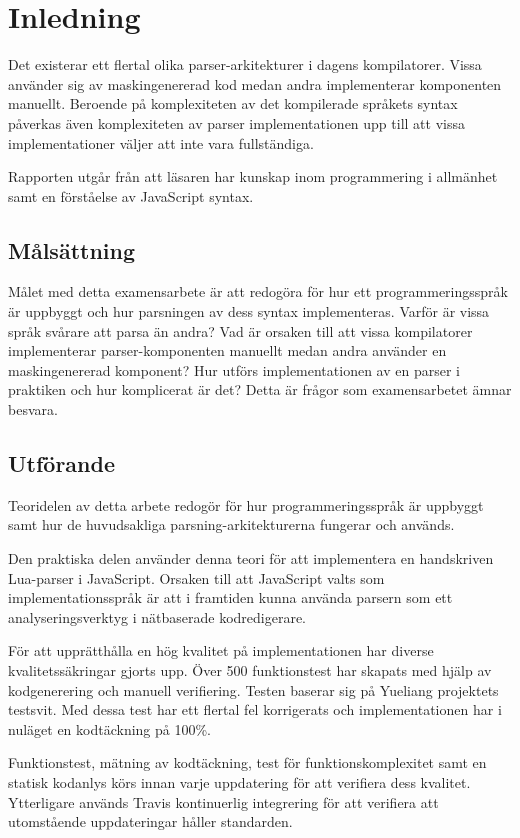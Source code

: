 \section{Inledning}

Det existerar ett flertal olika parser-arkitekturer i dagens kompilatorer.
Vissa använder sig av maskingenererad kod medan andra implementerar
komponenten manuellt. Beroende på komplexiteten av det kompilerade språkets
syntax påverkas även komplexiteten av parser implementationen upp till att
vissa implementationer väljer att inte vara fullständiga.

Rapporten utgår från att läsaren har kunskap inom programmering i allmänhet
samt en förståelse av JavaScript syntax.

\subsection{Målsättning}

Målet med detta examensarbete är att redogöra för hur ett programmeringsspråk
är uppbyggt och hur parsningen av dess syntax implementeras. Varför är vissa
språk svårare att parsa än andra? Vad är orsaken till att vissa kompilatorer
implementerar parser-komponenten manuellt medan andra använder en
maskingenererad komponent? Hur utförs implementationen av en parser i
praktiken och hur komplicerat är det? Detta är frågor som examensarbetet ämnar
besvara.

\subsection{Utförande}

Teoridelen av detta arbete redogör för hur programmeringsspråk är uppbyggt
samt hur de huvudsakliga parsning-arkitekturerna fungerar och används.

Den praktiska delen använder denna teori för att implementera en handskriven
Lua-parser i JavaScript. Orsaken till att JavaScript valts som
implementationsspråk är att i framtiden kunna använda parsern som ett
analyseringsverktyg i nätbaserade kodredigerare.

För att upprätthålla en hög kvalitet på implementationen har diverse
kvalitetssäkringar gjorts upp. Över 500 funktionstest har skapats med hjälp av
kodgenerering och manuell verifiering. Testen baserar sig på Yueliang
projektets testsvit. Med dessa test har ett flertal fel korrigerats och
implementationen har i nuläget en kodtäckning på 100\%.

Funktionstest, mätning av kodtäckning, test för funktionskomplexitet samt en
statisk kodanlys körs innan varje uppdatering för att verifiera dess
kvalitet. Ytterligare används Travis kontinuerlig integrering för att
verifiera att utomstående uppdateringar håller standarden.

